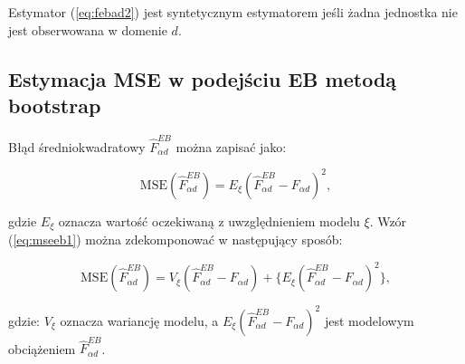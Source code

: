 Estymator (\ref{eq:febad2}) jest syntetycznym estymatorem jeśli żadna jednostka nie jest obserwowana w domenie $d$.



\subsection{Estymacja MSE w podejściu EB metodą bootstrap}

Błąd średniokwadratowy $\hat{F}^{EB}_{\alpha d}$ można zapisać jako:

\begin{equation}
\text{MSE}(\hat{F}^{EB}_{\alpha d})=E_{\xi}(\hat{F}^{EB}_{\alpha d}-F_{\alpha d})^2,
\label{eq:mseeb1}
\end{equation}

gdzie $E_{\xi}$ oznacza wartość oczekiwaną z uwzględnieniem modelu $\xi$. Wzór (\ref{eq:mseeb1}) można zdekomponować w następujący sposób:


\begin{equation}
\text{MSE}(\hat{F}^{EB}_{\alpha d})=V_{\xi}(\hat{F}^{EB}_{\alpha d}-F_{\alpha d})+\{E_{\xi}(\hat{F}^{EB}_{\alpha d}-F_{\alpha d})^2\},
\label{eq:mseeb2}
\end{equation}

gdzie: $V_{\xi}$ oznacza wariancję modelu, a $E_{\xi}(\hat{F}^{EB}_{\alpha d}-F_{\alpha d})^2$ jest modelowym obciążeniem $\hat{F}^{EB}_{\alpha d}$. 


